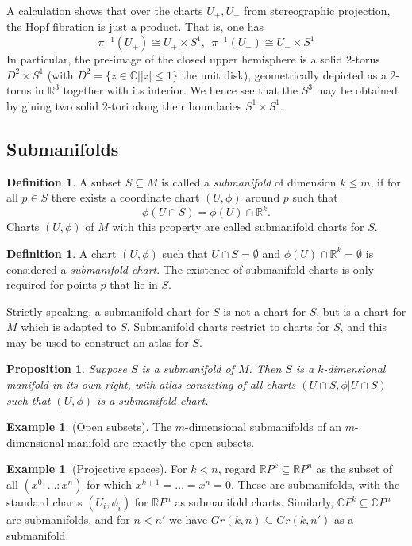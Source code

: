 \documentclass{article}
\newtheorem{proposition}{Proposition}[theorem]
\theoremstyle{definition}
\newtheorem{defn}[theorem]{Definition}
\newtheorem{example}[theorem]{Example}
\newenvironment{definition}
  {\vspace{8pt}\begin{mdframed}[backgroundcolor=blueish]\begin{defn}}
  {\end{defn}\end{mdframed}\vspace{4pt}}
\begin{document}
A calculation shows that over the charts $U_+,U_-$ from stereographic projection, the Hopf fibration is just a product. That is, one has
\[
    \pi^{-1} (U_+) \cong U_+ \times S^1, \ \ \pi^{-1} (U_-) \cong U_- \times S^1
\]
In particular, the pre-image of the closed upper hemisphere is a solid 2-torus $D^2 \times S^1$ (with $D^2 = \{ z \in \mathbb C| |z| \leq 1 \}$ the unit disk), geometrically depicted as a 2-torus in $\mathbb R^3$ together with its interior. We hence see that the $S^3$ may be obtained by gluing two solid 2-tori along their boundaries $S^1 \times S^1$.

\subsection{Submanifolds}
\begin{definition}
A subset $S \subseteq M$ is called a \textit{submanifold} of dimension $k \leq m$, if for all $p \in S$ there exists a coordinate chart $(U,\phi)$ around $p$ such that
\[
    \phi(U \cap S) = \phi(U) \cap \mathbb R^k .
\] 
Charts $(U,\phi)$ of $M$ with this property are called submanifold charts for $S$.
\end{definition}

\begin{definition}
A chart $(U, \phi)$ such that $U \cap S = \emptyset$ and $\phi (U) \cap \mathbb R^k = \emptyset$ is considered a \textit{submanifold chart}. The existence of submanifold charts is only required for points $p$ that lie in $S$. 
\end{definition}

Strictly speaking, a submanifold chart for $S$ is not a chart for $S$, but is a chart for $M$ which is adapted to $S$. Submanifold charts restrict to charts for $S$, and this may be used to construct an atlas for $S$.

\begin{proposition}
Suppose $S$ is a submanifold of $M$. Then $S$ is a $k$-dimensional manifold in its own right, with atlas consisting of all charts $(U \cap S, \phi|U \cap S)$ such that $(U,\phi)$ is a submanifold chart.
\end{proposition}

\begin{example} (Open subsets). The $m$-dimensional submanifolds of an $m$-dimensional manifold are exactly the open subsets.
\end{example}

\begin{example} (Projective spaces). For $k < n$, regard $\mathbb R P^k \subseteq \mathbb R P^n$ as the subset of all  $(x^0 : \dots : x^n )$ for which $x^{k+1} = \dots = x^n = 0$. These are submanifolds, with the standard charts $(U_i ,\phi_i)$ for $\mathbb R P^n$ as submanifold charts. Similarly, $\mathbb C P^k \subseteq \mathbb C P^n$ are submanifolds, and for $n < n'$ we have $Gr(k,n) \subseteq Gr(k,n')$ as a submanifold.

\end{example}
\end{document}
